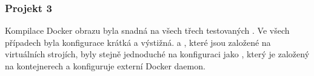         \subsubsection{Projekt 3}
            Kompilace Docker obrazu byla snadná na všech třech testovaných  \CI. Ve všech případech byla konfigurace krátká a výstižná. \travis a \semaphore, které jsou založené na virtuálních strojích, byly stejně jednoduché na konfiguraci jako \circleci, který je založený na kontejnerech a konfiguruje externí Docker daemon.
